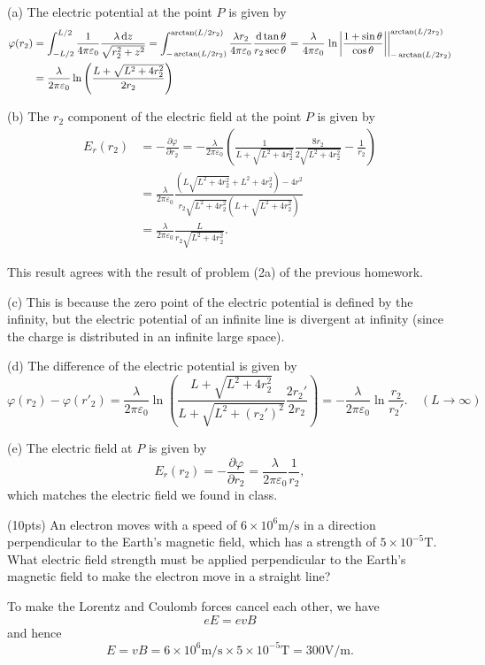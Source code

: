 \documentclass{article}
\begin{document}
\begin{solution}
  (a) The electric potential at the point \( P \) is given by
  \begin{align*}
    \varphi(r_2)
    &=\int_{-L/2}^{L/2}\frac{1}{4\pi \varepsilon_0} \frac{\lambda \,\mathrm{d} z}{\sqrt{r_2^2 + z^2}}
    =\int_{-\arctan(L/2r_2)}^{\arctan(L/2r_2)}\frac{\lambda r_2}{4\pi\varepsilon_0}\frac{\,\mathrm{d}\tan\theta}{r_2\sec\theta}
    =\frac{\lambda}{4\pi\varepsilon_0}\left.\ln\left|\frac{1+\sin\theta}{\cos\theta}\right|\right|^{\arctan(L/2r_2)}_{-\arctan(L/2r_2)}\\
    &=\frac{\lambda}{2\pi\varepsilon_0}\ln\left( \frac{L+\sqrt{L^2+4r_2^2}}{2r_2} \right)
  \end{align*} 

  (b) The \( r_2 \) component of the electric field at the point \( P \) is given by
  \begin{align*}
    E_r(r_2) &= -\frac{\partial \varphi}{\partial r_2} 
    =-\frac{\lambda}{2\pi\varepsilon_0}\left( \frac{1}{L+\sqrt{L^2+4r_2^2}}\frac{8r_2}{2\sqrt{L^2+4r_2^2}}-\frac{1}{r_2} \right)\\
    &=\frac{\lambda}{2\pi\varepsilon_0}\frac{\left( L\sqrt{L^2+4r_2^2}+L^2+4r_2^2 \right)-4r^2}{r_2\sqrt{L^2+4r_2^2}\left( L+\sqrt{L^2+4r_2^2} \right)}\\
    &=\frac{\lambda}{2\pi\varepsilon_0}\frac{L}{r_2\sqrt{L^2+4r_2^2}}.
  \end{align*}

  This result agrees with the result of problem (2a) of the previous homework.

  (c) This is because the zero point of the electric potential is defined by the infinity, but the electric potential of an infinite line is divergent at infinity (since the charge is distributed in an infinite large space).

  (d) The difference of the electric potential is given by
  \[ \varphi(r_2) - \varphi(r'_2)=\frac{\lambda}{2\pi\varepsilon_0}\ln\left( \frac{L+\sqrt{L^2+4r_2^2}}{L+\sqrt{L^2+(r_2')^2}}\frac{2r_2'}{2r_2} \right)=-\frac{\lambda}{2\pi\varepsilon_0}\ln\frac{r_2}{r_2'}.\quad (L\to\infty) \]

  (e) The electric field at \( P \) is given by
  \[ E_r(r_2)=-\frac{\partial \varphi}{\partial r_2}=\frac{\lambda}{2\pi\varepsilon_0}\frac{1}{r_2}, \]
  which matches the electric field we found in class.
\end{solution}



\begin{problem}
(10pts) An electron moves with a speed of $6 \times 10^6 \mathrm{ m/s}$ in a direction perpendicular to the Earth's magnetic field, which has a strength of $5 \times 10^{-5} \mathrm{ T}$. What electric field strength must be applied perpendicular to the Earth's magnetic field to make the electron move in a straight line?
\end{problem}

\begin{solution}
  To make the Lorentz and Coulomb forces cancel each other, we have
  \[ eE = evB \]
  and hence
  \[ E = vB = 6 \times 10^6 \mathrm{ m/s} \times 5 \times 10^{-5} \mathrm{ T} = 300 \mathrm{ V/m}. \]
\end{solution}
\end{document}
